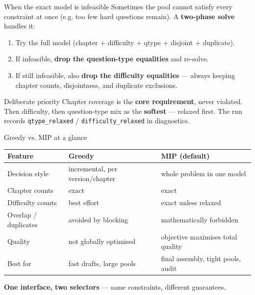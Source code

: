 \documentclass[11pt,aspectratio=169]{beamer}
\newcommand{\code}[1]{\texttt{\small #1}}
\begin{document}
\begin{frame}{When the exact model is infeasible}
  Sometimes the pool cannot satisfy every constraint at once (e.g. too few hard
  questions remain). A \textbf{two-phase solve} handles it:

  \vspace{2mm}
  \begin{enumerate}
    \item Try the full model (chapter + difficulty + qtype + disjoint + duplicate).
    \item If infeasible, \textbf{drop the question-type equalities} and re-solve.
    \item If still infeasible, also \textbf{drop the difficulty equalities} —
          always keeping chapter counts, disjointness, and duplicate exclusions.
  \end{enumerate}

  \vspace{2mm}
  \begin{block}{Deliberate priority}
    Chapter coverage is the \textbf{core requirement}, never violated. Then
    difficulty, then question-type mix as the \textbf{softest} — relaxed first.
    The run records \code{qtype\_relaxed} / \code{difficulty\_relaxed} in
    diagnostics.
  \end{block}
\end{frame}

\begin{frame}{Greedy vs. MIP at a glance}
  \begin{center}\footnotesize
  \begin{tabular}{@{}p{3.0cm}p{3.6cm}p{4.0cm}@{}}
    \toprule
    \textbf{Feature} & \textbf{Greedy} & \textbf{MIP (default)} \\
    \midrule
    Decision style & incremental, per version/chapter & whole problem in one model \\
    Chapter counts & exact & exact \\
    Difficulty counts & best effort & exact unless relaxed \\
    Overlap / duplicates & avoided by blocking & mathematically forbidden \\
    Quality & not globally optimised & objective maximises total quality \\
    Best for & fast drafts, large pools & final assembly, tight pools, audit \\
    \bottomrule
  \end{tabular}
  \end{center}
  \vspace{2mm}
  \begin{center}
  \textbf{\color{faublue}One interface, two selectors} — same constraints, different guarantees.
  \end{center}
\end{frame}
\end{document}
